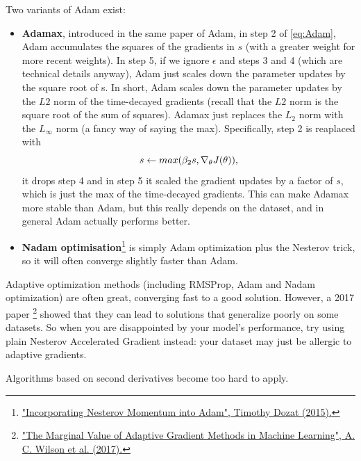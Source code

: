 \documentclass[12pt, letterpaper]{article}
\theoremstyle{definition}
\DeclarePairedDelimiter\autobracket{(}{)}
\newcommand{\br}[1]{\autobracket*{#1}}
\let\tb\textbf
\begin{document}
Two variants of Adam exist:
\begin{itemize}
\item \tb{Adamax}, introduced in the same paper of Adam, in step 2 of \autoref{eq:Adam}, Adam accumulates the squares of the gradients in $s$ (with a greater weight for more recent weights). In step 5, if we ignore $\epsilon$ and steps 3 and 4 (which are technical details anyway), Adam just scales down the parameter updates by the square root of s. In short, Adam scales down the parameter updates by the $L2$ norm of the time-decayed gradients (recall that the $L2$ norm is the square root of the sum of squares). Adamax just replaces the $L_2$ norm with the $L_\infty$ norm (a fancy way of saying the max). Specifically, step 2 is reaplaced with
\begin{equation}
s \leftarrow max\br{\beta_2 s, \nabla_\theta J(\theta)},
\end{equation}
it drops step 4 and in step 5 it scaled the gradient updates by a factor of $s$, which is just the max of the time-decayed gradients. This can make Adamax more stable than Adam, but this really depends on the dataset, and in general Adam actually performs better.
\item \tb{Nadam optimisation}\footnote{\href{https://homl.info/nadam}{"Incorporating Nesterov Momentum into Adam", Timothy Dozat (2015).}} is simply Adam optimization plus the Nesterov trick, so it will often converge slightly faster than Adam. 
\end{itemize}

Adaptive optimization methods (including RMSProp, Adam and Nadam optimization) are often great, converging fast to a good solution. However, a 2017 paper \footnote{\href{https://homl.info/60}{"The Marginal Value of Adaptive Gradient Methods in Machine Learning", A. C. Wilson et al. (2017).}} showed that they can lead to solutions that generalize poorly on some datasets. So when you are disappointed by your model's performance, try using plain Nesterov Accelerated Gradient instead: your dataset may just be allergic to adaptive gradients.

Algorithms based on second derivatives become too hard to apply.
\end{document}
